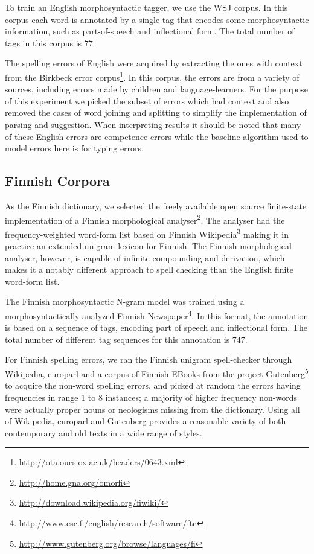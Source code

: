 \documentclass[postprint]{flammie}
\begin{document}
To train an English morphosyntactic tagger, we use the WSJ corpus. In
this corpus each word is annotated by a single tag that encodes some
morphosyntactic information, such as part-of-speech and inflectional
form.  The total number of tags in this corpus is $77$.

The spelling errors of English were acquired by extracting the ones with
context from the Birkbeck error
corpus\footnote{\url{http://ota.oucs.ox.ac.uk/headers/0643.xml}}. In this
corpus, the errors are from a variety of sources, including errors made by
children and language-learners. For the purpose of this experiment we picked
the subset of errors which had context and also removed the cases of word
joining and splitting to simplify the implementation of parsing and suggestion.
When interpreting results it should be noted that many of these English errors
are competence errors while the baseline algorithm used to model errors here is
for typing errors.

\subsection{Finnish Corpora}

As the Finnish dictionary, we selected the freely available open source
finite-state implementation of a Finnish morphological
analyser\footnote{\url{http://home.gna.org/omorfi}}. The analyser had the
frequency-weighted word-form list based on Finnish
Wikipedia\footnote{\url{http://download.wikipedia.org/fiwiki/}} making it in
practice an extended unigram lexicon for Finnish. The Finnish morphological
analyser, however, is capable of infinite compounding and derivation, which
makes it a notably different approach to spell checking than the English finite
word-form list. 

The Finnish morphosyntactic N-gram model was trained using a
morphosyntactically analyzed Finnish
Newspaper\footnote{\url{http://www.csc.fi/english/research/software/ftc}}. In
this format, the annotation is based on a sequence of tags, encoding
part of speech and inflectional form. The total number of different
tag sequences for this annotation is 747.

For Finnish spelling errors, we ran the Finnish unigram spell-checker through
Wikipedia, europarl and a corpus of Finnish EBooks from the project
Gutenberg\footnote{\url{http://www.gutenberg.org/browse/languages/fi}} to
acquire the non-word spelling errors, and picked at random the errors having
frequencies in range 1 to 8 instances; a majority of higher frequency non-words
were actually proper nouns or neologisms missing from the dictionary. Using all of
Wikipedia, europarl and Gutenberg provides a reasonable variety of both
contemporary and old texts in a wide range of styles.
\end{document}
